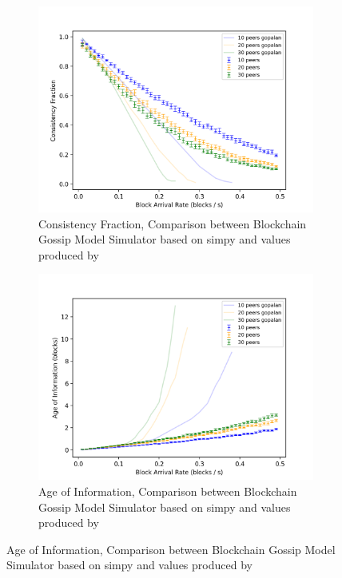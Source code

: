 \begin{figure}[h]
\begin{subfigure}[b]{0.48\textwidth}
	\end{subfigure}
	\hfill
	\begin{subfigure}[b]{0.48\textwidth}
		\includegraphics[width=\textwidth]{figures/gopalan_figures/consistency_fraction.png}
		\caption{ Consistency Fraction, Comparison between Blockchain Gossip Model Simulator based on simpy and values produced by \gopalan}
		\label{fig:gopalan_cf}
	\end{subfigure}
	\hfill
	\begin{subfigure}[b]{0.48\textwidth}
		\includegraphics[width=\textwidth]{figures/gopalan_figures/age_of_information.png}
		\caption{ Age of Information, Comparison between Blockchain Gossip Model Simulator based on simpy and values produced by \gopalan}
		\label{fig:gopalan_aof}
	\end{subfigure}
\end{figure} 

